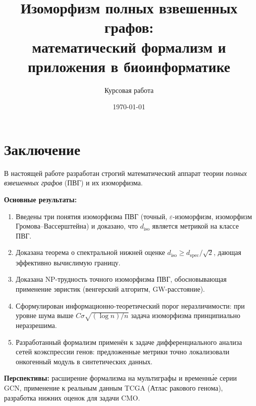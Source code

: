 \documentclass[12pt, a4paper]{article}
\title{%
    \Large\textbf{Изоморфизм полных взвешенных графов:}\\
    \Large\textbf{математический формализм и приложения в биоинформатике}
    \vspace{0.5em}
}
\author{%
    \normalsize Курсовая работа
}
\date{\today}
\theoremstyle{definition}
\theoremstyle{plain}
\theoremstyle{remark}
\begin{document}
\maketitle
\tableofcontents
\newpage


\newpage


\newpage


\newpage


\newpage

\section{Заключение}
\label{sec:conclusion}

В настоящей работе разработан строгий математический аппарат теории
\emph{полных взвешенных графов} (ПВГ) и их изоморфизма.

\textbf{Основные результаты:}
\begin{enumerate}
    \item Введены три понятия изоморфизма ПВГ (точный, $\varepsilon$-изоморфизм,
          изоморфизм Громова–Вассерштейна) и доказано, что $d_{\mathrm{iso}}$
          является метрикой на классе ПВГ.
    \item Доказана теорема о спектральной нижней оценке
          $d_{\mathrm{iso}} \ge d_{\mathrm{spec}}/\sqrt{2}$,
          дающая эффективно вычислимую границу.
    \item Доказана NP-трудность точного изоморфизма ПВГ, обосновывающая
          применение эвристик (венгерский алгоритм, GW-расстояние).
    \item Сформулирован информационно-теоретический порог неразличимости:
          при уровне шума выше $C \sigma \sqrt{(\log n)/n}$ задача изоморфизма
          принципиально неразрешима.
    \item Разработанный формализм применён к задаче дифференциального
          анализа сетей коэкспрессии генов: предложенные метрики точно
          локализовали онкогенный модуль в синтетических данных.
\end{enumerate}

\textbf{Перспективы:}
расширение формализма на мультиграфы и временны́е серии GCN,
применение к реальным данным TCGA (Атлас ракового генома),
разработка нижних оценок для задачи CMO.



\end{document}
